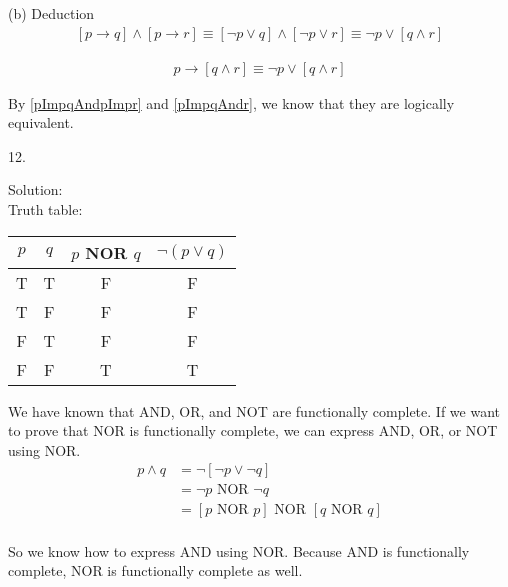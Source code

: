 \documentclass[12pt]{article}
\begin{document}
\indent (b) Deduction\\
\begin{align}
\label{pImpqAndpImpr}
[p \to q] \land [p \to r] \equiv [\lnot p \lor q] \land [\lnot p \lor r] \equiv \lnot p \lor [q \land r] 
\end{align}

\begin{align}
\label{pImpqAndr}
p \to [q \land r] \equiv \lnot p \lor [q\land r]
\end{align}

By \ref{pImpqAndpImpr} and \ref{pImpqAndr}, we know that they are logically equivalent.
\newline

12. 

\indent Solution:\\
\indent Truth table:\\
\begin{center}
\begin{tabular}{c|c|c|c}
    $p$ & $q$ & $p $ NOR $ q$ & $\lnot (p \lor q)$ \\
\hline
T & T & F & F\\
T & F & F & F\\
F & T & F & F\\
F & F & T & T
\end{tabular}
\end{center}

\indent We have known that AND, OR, and NOT are functionally complete. If we want to prove that NOR is functionally complete, we can express AND, OR, or NOT using NOR.\\

\begin{align*}
p \land q &= \lnot [\lnot p \lor \lnot q] \\
          &= \lnot p \text{ NOR } \lnot q \\
          &= [p \text{ NOR } p] \text{ NOR } [q \text{ NOR } q] \\
\end{align*}

\indent So we know how to express AND using NOR. Because AND is functionally complete, NOR is functionally complete as well. \\
\end{document}
